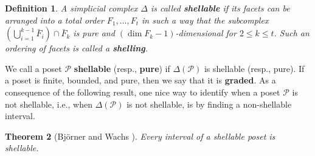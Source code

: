 \documentclass[letterpaper,10pt]{article}
\newtheorem{theorem}{Theorem}
\newtheorem{lemma}[theorem]{Lemma}
\newtheorem{definition}[theorem]{Definition}
\newtheorem{remark}[theorem]{Remark}
\begin{document}
\begin{definition}
    A simplicial complex $\Delta$ is called \textbf{shellable} if its facets can be arranged into a total order $F_1,\hdots,F_t$ in such a way that the subcomplex $\left(\bigcup_{i=1}^{k-1}\bar{F}_i\right)\cap \bar{F}_k$ is pure and $(\dim F_k-1)$-dimensional for $2\le k\le t$. Such an ordering of facets is called a \textbf{shelling}.
\end{definition}

We call a poset $\mathcal{P}$ \textbf{shellable} (resp., \textbf{pure}) if $\Delta(\mathcal{P})$ is shellable (resp., pure). If a poset is finite, bounded, and pure, then we say that it is \textbf{graded}. As a consequence of the following result, one nice way to identify when a poset $\mathcal{P}$ is not shellable, i.e., when $\Delta(\mathcal{P})$ is not shellable, is by finding a non-shellable interval.


\begin{theorem}[Bj\"orner and Wachs \textbf{\cite{npshell2}}]\label{thm:shellinterval}
    Every interval of a shellable poset is shellable.
\end{theorem}




\end{document}
